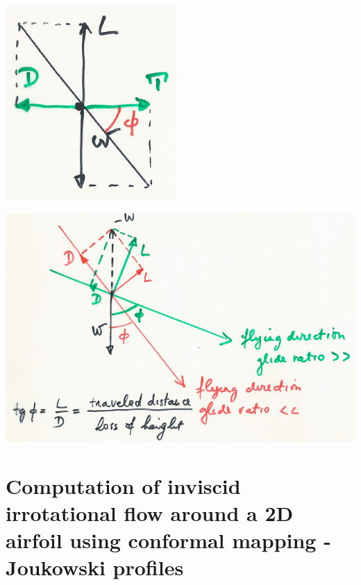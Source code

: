 \documentclass[british,french,11pt, a4paper, openany]{article}
\begin{document}
\begin{center}
	\begin{minipage}{0.3\textwidth}
		\includegraphics[scale=0.5]{ch2/22}
		\label{fig:2.21}
	\end{minipage}
	\begin{minipage}{0.5\textwidth}
		\includegraphics[scale=0.2]{ch2/23}
		\label{fig:2.22}
	\end{minipage}
\end{center}

\section{Computation of inviscid irrotational flow around a 2D airfoil using conformal mapping - Joukowski profiles}
\end{document}

